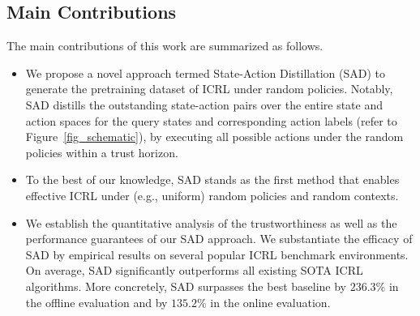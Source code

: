
\subsection{Main Contributions}


The main contributions of this work are summarized as follows.
\begin{itemize}
    \item We propose a novel approach termed State-Action Distillation (SAD) to generate the pretraining dataset of ICRL under random policies. Notably, SAD distills the outstanding state-action pairs over the entire state and action spaces for the query states and corresponding action labels (refer to Figure~\ref{fig_schematic}), by executing all possible actions under the random policies within a trust horizon.
    
    \item To the best of our knowledge, SAD stands as the first method that enables effective ICRL under (e.g., uniform) random policies and random contexts.

    \item We establish the quantitative analysis of the trustworthiness as well as the performance guarantees of our SAD approach. We substantiate the efficacy of SAD by empirical results on several popular ICRL benchmark environments.
    On average, SAD significantly outperforms all existing SOTA ICRL algorithms. More concretely, SAD surpasses the best baseline by $236.3\%$ in the offline evaluation and by $135.2\%$ in the online evaluation.
\end{itemize}




